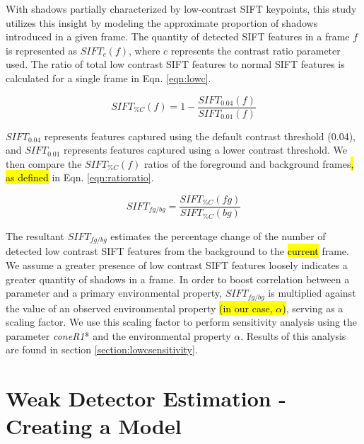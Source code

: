 With shadows partially characterized by low-contrast SIFT keypoints, this study utilizes this insight by modeling the approximate proportion of shadows introduced in a given frame. The quantity of detected SIFT features in a frame $f$ is represented as $SIFT_{c}(f)$, where $c$ represents the contrast ratio parameter used.
The ratio of total low contrast SIFT features to normal SIFT features is calculated for a single frame in Eqn. \ref{eqn:lowc}.

\begin{equation}
SIFT_{\%C}(f) = 1 - \dfrac{SIFT_{0.04}(f)}{SIFT_{0.01}(f)}
\label{eqn:lowc}
\end{equation}

$SIFT_{0.04}$ represents features captured using the default contrast threshold (0.04), and $SIFT_{0.01}$ represents features captured using a lower contrast threshold. We then compare the $SIFT_{\%C}(f)$ ratios of the foreground and background frames\hl{, as defined} in Eqn. \ref{eqn:ratioratio}.

\begin{equation}
SIFT_{fg/bg} = \dfrac{SIFT_{\%C}(fg)}{SIFT_{\%C}(bg)}
\label{eqn:ratioratio}
\end{equation}

The resultant $SIFT_{fg/bg}$ estimates the percentage change of the number of detected low contrast SIFT features from the background to the \hl{current} frame. We assume a greater presence of low contrast SIFT features loosely indicates a greater quantity of shadows in a frame. In order to boost correlation between a parameter and a primary environmental property, $SIFT_{fg/bg}$ is multiplied against the value of an observed environmental property \hl{(in our case, $\alpha$)}, serving as a scaling factor. We use this scaling factor to perform sensitivity analysis using the parameter \textit{coneR1}* and the environmental property $\alpha$. Results of this analysis are found in section \ref{section:lowcsensitivity}.

\section{Weak Detector Estimation - Creating a Model} \label{section:model}

